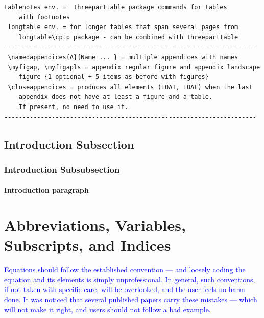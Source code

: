 \documentclass[phd,showframe]{ndsu-thesis-2022}
\newcommand\italk[1]{\textcolor{blue}{#1}}  %
\begin{document}
\begin{lstlisting}[basicstyle=\ttfamily\footnotesize\color{blue}]
 tablenotes env. =  threeparttable package commands for tables 
 	with footnotes 
 longtable env. = for longer tables that span several pages from 
 	longtable\cptp package - can be combined with threeparttable 
---------------------------------------------------------------------
 \namedappendices{A}{Name ... } = multiple appendices with names 
 \myfigap, \myfigapls = appendix regular figure and appendix landscape 
 	figure {1 optional + 5 items as before with figures}
 \closeappendices = produces all elements (LOAT, LOAF) when the last 
 	appendix does not have at least a figure and a table. 
	If present, no need to use it.
---------------------------------------------------------------------
\end{lstlisting}

\subsection{Introduction Subsection}
\kant[4]

\subsubsection{Introduction Subsubsection}
\kant[6]

\paragraph{Introduction paragraph}
\kant[8]


\section{Abbreviations, Variables, Subscripts, and Indices}
\italk{Equations should follow the established convention --- and loosely coding the equation and its elements is simply unprofessional. In general, such conventions, if not taken with specific care, will be overlooked, and the user feels no harm done. It was noticed that several published papers carry these mistakes --- which will not make it right, and users should not follow a bad example.}
\end{document}
